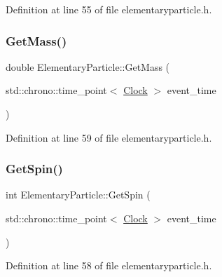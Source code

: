 Definition at line 55 of file elementaryparticle.\+h.

\mbox{\label{class_elementary_particle_a85400dc97f66c1ce23d9d961ddb6b8f3}} 
\subsubsection{\texorpdfstring{Get\+Mass()}{GetMass()}}
{\footnotesize\ttfamily double Elementary\+Particle\+::\+Get\+Mass (\begin{DoxyParamCaption}\item[{std\+::chrono\+::time\+\_\+point$<$ \mbox{\hyperlink{universe_8h_a0ef8d951d1ca5ab3cfaf7ab4c7a6fd80}{Clock}} $>$}]{event\+\_\+time }\end{DoxyParamCaption})\hspace{0.3cm}{\ttfamily [inline]}}



Definition at line 59 of file elementaryparticle.\+h.

\mbox{\label{class_elementary_particle_ad5f5a05770f94f4c8fee418d59098126}} 
\subsubsection{\texorpdfstring{Get\+Spin()}{GetSpin()}}
{\footnotesize\ttfamily int Elementary\+Particle\+::\+Get\+Spin (\begin{DoxyParamCaption}\item[{std\+::chrono\+::time\+\_\+point$<$ \mbox{\hyperlink{universe_8h_a0ef8d951d1ca5ab3cfaf7ab4c7a6fd80}{Clock}} $>$}]{event\+\_\+time }\end{DoxyParamCaption})\hspace{0.3cm}{\ttfamily [inline]}}



Definition at line 58 of file elementaryparticle.\+h.

\mbox{\label{class_elementary_particle_a63fe7df86d2fba4a64a69dfa5757e94e}} 
